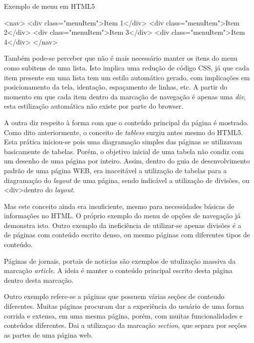 \documentclass[
	12pt,				%
	oneside,			%
	a4paper,			%
	english,			%
	brazil				%
	]{abntex2ppgsi}
\begin{document}
\begin{algorithm}[htbp]
	\caption{Exemplo de menu em HTML5}
	\label{alg:nav-novo}
	\begin{algorithmic}
		\State \textless nav\textgreater
			\State \textless div class="menuItem"\textgreater Item 1\textless/div\textgreater
			\State \textless div class="menuItem"\textgreater Item 2\textless/div\textgreater
			\State \textless div class="menuItem"\textgreater Item 3\textless/div\textgreater
			\State \textless div class="menuItem"\textgreater Item 4\textless/div\textgreater
		\State	\textless/nav\textgreater
	\end{algorithmic}
\end{algorithm}

Também pode-se perceber que não é mais necessário manter os itens do menu como subitens de uma lista. Isto implica uma redução de código CSS, já que cada item presente em uma lista tem um estilo automático gerado, com implicações em posicionamento da tela, identação, espaçamento de linhas, etc. A partir do momento em que cada item dentro da marcação de navegação é apenas uma \textit{div}, esta estilização automática não existe por parte do browser. 

A outra diz respeito à forma com que o conteúdo principal da página é mostrado. Como dito anteriormente, o conceito de \textit{tabless} surgiu antes mesmo do HTML5. Esta prática iniciou-se pois uma diagramação simples das páginas se utilizavam basicamente de tabelas. Porém, o objetivo inicial de uma tabela não condiz com um desenho de uma página por inteiro. Assim, dentro do guia de desenvolvimento padrão de uma página WEB, era inaceitável a utilização de tabelas para a diagramação do \textit{layout} de uma página, sendo indicável a utilização de divisões, ou \textless div\textgreater dentro do \textit{layout}. 

Mas este conceito ainda era insuficiente, mesmo para necessidades básicas de informações no HTML. O próprio exemplo do menu de opções de navegação já demonstra isto. Outro exemplo da ineficiência de utilizar-se apenas divisões é a de páginas com conteúdo escrito denso, ou mesmo páginas com diferentes tipos de conteúdo. 

Páginas de jornais, portais de noticias são exemplos de utulização massiva da marcação \textit{article}. A ideia é manter o conteúdo principal escrito desta página dentro desta marcação.

Outro exemplo refere-se a páginas que possuem várias seções de conteudo diferentes. Muitas páginas procuram dar a experiência do usuário de uma forma corrida e extensa, em uma mesma página, porém, com muitas funcionalidades e conteúdos diferentes. Dai a utilizaçao da marcação \textit{section}, que separa por seções as partes de uma página web.
\end{document}
